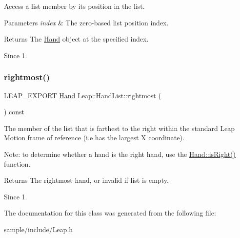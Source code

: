 Access a list member by its position in the list.


\begin{DoxyCodeInclude}
\end{DoxyCodeInclude}



\begin{DoxyParams}{Parameters}
{\em index} & The zero-\/based list position index. \\
\hline
\end{DoxyParams}
\begin{DoxyReturn}{Returns}
The \hyperlink{class_leap_1_1_hand}{Hand} object at the specified index. 
\end{DoxyReturn}
\begin{DoxySince}{Since}
1. 
\end{DoxySince}
\mbox{\label{class_leap_1_1_hand_list_a6094a73553380e84693b2cd96ce720dd}} 
\subsubsection{\texorpdfstring{rightmost()}{rightmost()}}
{\footnotesize\ttfamily L\+E\+A\+P\+\_\+\+E\+X\+P\+O\+RT \hyperlink{class_leap_1_1_hand}{Hand} Leap\+::\+Hand\+List\+::rightmost (\begin{DoxyParamCaption}{ }\end{DoxyParamCaption}) const}

The member of the list that is farthest to the right within the standard Leap Motion frame of reference (i.\+e has the largest X coordinate).

Note\+: to determine whether a hand is the right hand, use the \hyperlink{class_leap_1_1_hand_aeff477c4cb80ac3fd7e76db4911c300a}{Hand\+::is\+Right()} function.


\begin{DoxyCodeInclude}
\end{DoxyCodeInclude}


\begin{DoxyReturn}{Returns}
The rightmost hand, or invalid if list is empty. 
\end{DoxyReturn}
\begin{DoxySince}{Since}
1. 
\end{DoxySince}


The documentation for this class was generated from the following file\+:\begin{DoxyCompactItemize}
\item 
sample/include/Leap.\+h\end{DoxyCompactItemize}
